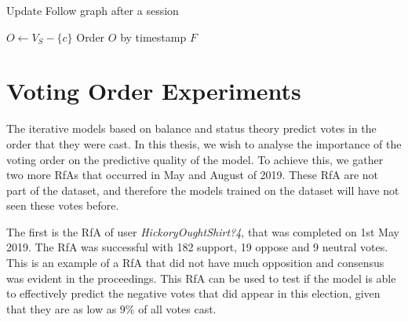 \begin{algorithm}[H]
    \DontPrintSemicolon
    \caption{Update Follow graph after a session}
    \label{alg:follow-update}
    $O \leftarrow V_{S}-\{c\}$\;
    Order $O$ by timestamp\;
    \Return $F$
\end{algorithm}

\section{Voting Order Experiments}
\label{sec:voting-order}
The iterative models based on balance and status theory predict votes in the order that they were cast.
In this thesis, we wish to analyse the importance of the voting order on the predictive quality of the model.
To achieve this, we gather two more RfAs that occurred in May and August of 2019.
These RfA are not part of the \wikirfa dataset, and therefore the models trained on the dataset will have not seen these votes before.

The first is the RfA of user \textit{HickoryOughtShirt?4}, that was completed on 1st May 2019.
The RfA was successful with 182 support, 19 oppose and 9 neutral votes.
This is an example of a RfA that did not have much opposition and consensus was evident in the proceedings.
This RfA can be used to test if the model is able to effectively predict the negative votes that did appear in this election, given that they are as low as $9\%$ of all votes cast.

